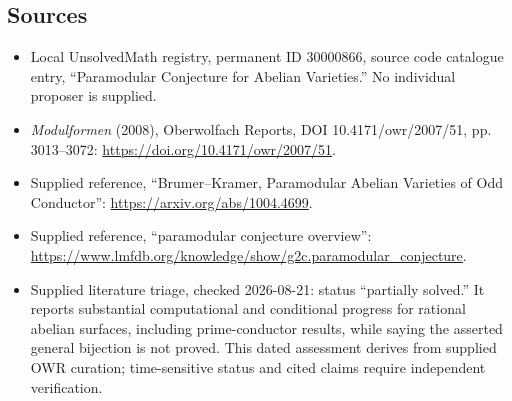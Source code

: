 \documentclass[11pt]{article}
\begin{document}
\subsection{Sources}
\begin{itemize}
\item Local UnsolvedMath registry, permanent ID \(30000866\), source code catalogue entry, ``Paramodular Conjecture for Abelian Varieties.'' No individual proposer is supplied.
\item \emph{Modulformen} (2008), Oberwolfach Reports, DOI 10.4171/owr/2007/51, pp. 3013--3072: \url{https://doi.org/10.4171/owr/2007/51}.
\item Supplied reference, ``Brumer--Kramer, Paramodular Abelian Varieties of Odd Conductor'': \url{https://arxiv.org/abs/1004.4699}.
\item Supplied reference, ``paramodular conjecture overview'': \url{https://www.lmfdb.org/knowledge/show/g2c.paramodular_conjecture}.
\item Supplied literature triage, checked 2026-08-21: status ``partially solved.'' It reports substantial computational and conditional progress for rational abelian surfaces, including prime-conductor results, while saying the asserted general bijection is not proved. This dated assessment derives from supplied OWR curation; time-sensitive status and cited claims require independent verification.
\end{itemize}
\end{document}
